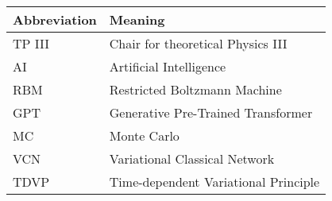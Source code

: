 \noindent\\\\

\begin{tabular}[h]{p{3cm}|l}
	Abbreviation & Meaning\\
	\hline
	TP III & Chair for theoretical Physics III\\
	AI & Artificial Intelligence\\
	RBM & Restricted Boltzmann Machine\\ 
	GPT & Generative Pre-Trained Transformer\\
	MC & Monte Carlo\\
	VCN & Variational Classical Network\\ 
	TDVP & Time-dependent Variational Principle\\ 
\end{tabular}\\\\

\newpage